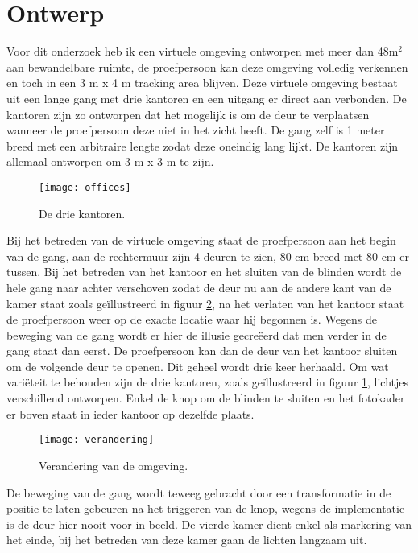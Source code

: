 \section{Ontwerp}
Voor dit onderzoek heb ik een virtuele omgeving ontworpen met meer dan 48m$^2$
aan bewandelbare ruimte, de proefpersoon kan deze omgeving volledig verkennen en
toch in een 3 m x 4 m tracking area blijven. Deze virtuele omgeving bestaat uit 
een lange gang met drie kantoren en een uitgang er direct aan verbonden. De 
kantoren zijn zo ontworpen dat het mogelijk is om de deur te verplaatsen wanneer 
de proefpersoon deze niet in het zicht heeft. De gang zelf is 1 meter breed met 
een arbitraire lengte zodat deze oneindig lang lijkt. De kantoren zijn allemaal 
ontworpen om 3 m x 3 m te zijn.

\begin{figure}[h!]
    \centering
    \texttt{[image: offices]}
    \caption{De drie kantoren.}
    \label{fig:kantoren}
\end{figure}

Bij het betreden van de virtuele omgeving staat de proefpersoon aan het begin van
de gang, aan de rechtermuur zijn 4 deuren te zien, 80 cm breed met 80 cm er
tussen. Bij het betreden van het kantoor en het sluiten van de blinden wordt de 
hele gang naar achter verschoven zodat de deur nu aan de andere kant van de kamer 
staat zoals ge\"illustreerd in figuur \ref{fig:verandering}, na het verlaten van 
het kantoor staat de proefpersoon weer op de exacte locatie waar hij begonnen is.
Wegens de beweging van de gang wordt er hier de illusie gecre\"eerd dat men
verder in de gang staat dan eerst. De proefpersoon kan dan de deur van het 
kantoor sluiten om de volgende deur te openen. Dit geheel wordt drie keer 
herhaald. Om wat vari\"eteit te behouden zijn de drie kantoren, zoals 
ge\"illustreerd in figuur \ref{fig:kantoren}, lichtjes verschillend ontworpen. 
Enkel de knop om de blinden te sluiten en het fotokader er boven staat in ieder 
kantoor op dezelfde plaats.

\begin{figure}[h!]
    \centering
    \texttt{[image: verandering]}
    \caption{Verandering van de omgeving.}
    \label{fig:verandering}
\end{figure}

De beweging van de gang wordt teweeg gebracht door een transformatie in de
positie te laten gebeuren na het triggeren van de knop, wegens de implementatie
is de deur hier nooit voor in beeld. De vierde kamer dient enkel als markering 
van het einde, bij het betreden van deze kamer gaan de lichten langzaam uit.

